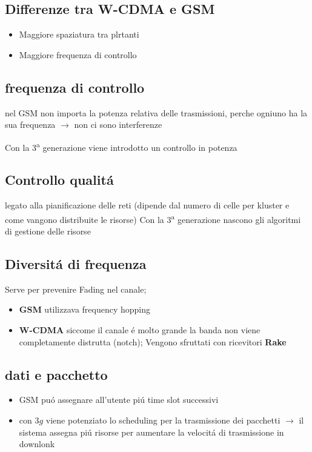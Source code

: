 \documentclass{article}
\begin{document}
\subsection{Differenze tra W-CDMA e GSM }

\begin{itemize}
    \item  Maggiore spaziatura tra plrtanti
    \item Maggiore frequenza di controllo

\end{itemize}

\subsection{frequenza di controllo} nel GSM non importa la potenza relativa delle trasmissioni, perche ogniuno ha la sua frequenza $\rightarrow$ non ci sono interferenze

Con la 3\textsuperscript{a} generazione viene introdotto un controllo in potenza


\subsection{Controllo qualit\'a}
legato alla pianificazione delle reti (dipende dal numero di celle per kluster e come vangono distribuite le risorse) Con la 3\textsuperscript{a} generazione nascono gli algoritmi di gestione delle risorse


\subsection{Diversit\'a di frequenza}
Serve per prevenire Fading nel canale;
\begin{itemize}
    \item \textbf{GSM} utilizzava frequency hopping
    \item \textbf{W-CDMA} siccome il canale \'e molto grande la banda non viene completamente distrutta (notch); Vengono sfruttati con ricevitori \textbf{Rake}
\end{itemize}

\subsection{dati e pacchetto}

\begin{itemize}
    \item GSM pu\'o assegnare all'utente pi\'u time slot successivi
    \item con \textbf{$3g$} viene potenziato lo scheduling per la trasmissione dei pacchetti $\rightarrow$ il sistema assegna pi\'u risorse per aumentare la velocit\'a di trasmissione in downlonk
\end{itemize}
\end{document}
